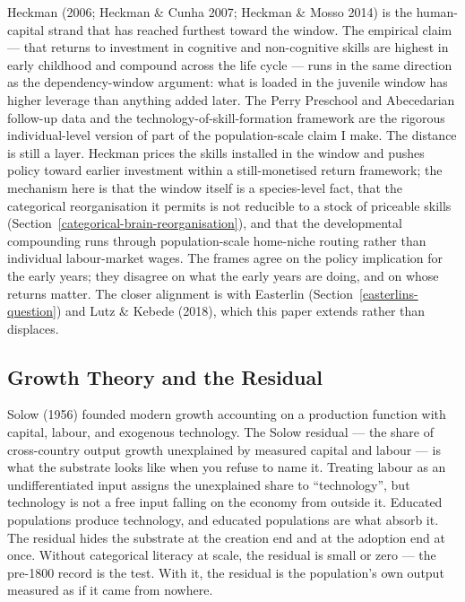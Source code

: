 \documentclass[12pt,letterpaper]{article}
\begin{document}
Heckman (2006; Heckman \& Cunha 2007; Heckman \& Mosso 2014) is the
human-capital strand that has reached furthest toward the window.
The empirical claim --- that returns to investment in cognitive and
non-cognitive skills are highest in early childhood and compound
across the life cycle --- runs in the same direction as the
dependency-window argument: what is loaded in the juvenile window has
higher leverage than anything added later. The Perry Preschool and
Abecedarian follow-up data and the technology-of-skill-formation
framework are the rigorous individual-level version of part of the
population-scale claim I make. The distance is still a layer. Heckman
prices the skills installed in the window and pushes policy toward
earlier investment within a still-monetised return framework; the
mechanism here is that the window itself is a species-level fact,
that the categorical reorganisation it permits is not reducible to a
stock of priceable skills
(Section~\ref{categorical-brain-reorganisation}), and that the
developmental compounding runs through population-scale home-niche
routing rather than individual labour-market wages. The frames agree
on the policy implication for the early years; they disagree on what
the early years are doing, and on whose returns matter. The closer
alignment is with Easterlin
(Section~\ref{easterlins-question}) and Lutz \& Kebede (2018), which
this paper extends rather than displaces.

\subsection{Growth Theory and the Residual}\label{growth-theory-and-the-residual}

Solow (1956) founded modern growth accounting on a production function with capital, labour, and exogenous technology. The Solow residual --- the share of cross-country output growth unexplained by measured capital and labour --- is what the substrate looks like when you refuse to name it. Treating labour as an undifferentiated input assigns the unexplained share to ``technology'', but technology is not a free input falling on the economy from outside it. Educated populations produce technology, and educated populations are what absorb it. The residual hides the substrate at the creation end and at the adoption end at once. Without categorical literacy at scale, the residual is small or zero --- the pre-1800 record is the test. With it, the residual is the population's own output measured as if it came from nowhere.
\end{document}
